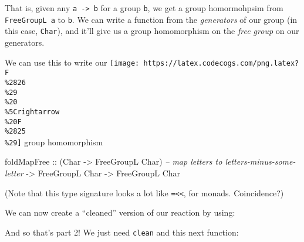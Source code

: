 \documentclass[]{article}
\newenvironment{Shaded}{}{}
\newcommand{\CharTok}[1]{\textcolor[rgb]{0.25,0.44,0.63}{#1}}
\newcommand{\CommentTok}[1]{\textcolor[rgb]{0.38,0.63,0.69}{\textit{#1}}}
\newcommand{\DataTypeTok}[1]{\textcolor[rgb]{0.56,0.13,0.00}{#1}}
\newcommand{\FunctionTok}[1]{\textcolor[rgb]{0.02,0.16,0.49}{#1}}
\newcommand{\KeywordTok}[1]{\textcolor[rgb]{0.00,0.44,0.13}{\textbf{#1}}}
\newcommand{\NormalTok}[1]{#1}
\newcommand{\OtherTok}[1]{\textcolor[rgb]{0.00,0.44,0.13}{#1}}
\begin{document}
That is, given any \texttt{a\ -\textgreater{}\ b} for a group \texttt{b}, we get
a group homormohpsim from \texttt{FreeGroupL\ a} to \texttt{b}. We can write a
function from the \emph{generators} of our group (in this case, \texttt{Char}),
and it'll give us a group homomorphism on the \emph{free group} on our
generators.

We can use this to write our
\texttt{[image: https://latex.codecogs.com/png.latex?F\\\%2826\\\%29\\\%20\\\%5Crightarrow\\\%20F\\\%2825\\\%29]}
group homomorphism

\begin{Shaded}
\begin{Highlighting}[]
\NormalTok{foldMapFree}
\OtherTok{    ::}\NormalTok{ (}\DataTypeTok{Char} \OtherTok{->} \DataTypeTok{FreeGroupL} \DataTypeTok{Char}\NormalTok{)  }\CommentTok{-- map letters to letters-minus-some-letter}
    \OtherTok{->} \DataTypeTok{FreeGroupL} \DataTypeTok{Char}
    \OtherTok{->} \DataTypeTok{FreeGroupL} \DataTypeTok{Char}
\end{Highlighting}
\end{Shaded}

(Note that this type signature looks a lot like
\texttt{=\textless{}\textless{}}, for monads. Coincidence?)

We can now create a ``cleaned'' version of our reaction by using:

\begin{Shaded}
\end{Shaded}

And so that's part 2! We just need \texttt{clean} and this next function:

\begin{Shaded}
\end{Shaded}
\end{document}
